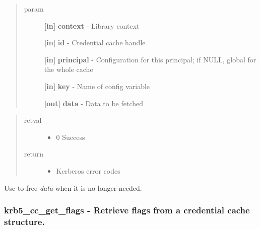 \documentclass[letterpaper,10pt,english]{sphinxmanual}
\begin{document}
\begin{quote}\begin{description}
\item[{param}] \leavevmode
\textbf{{[}in{]}} \textbf{context} - Library context

\textbf{{[}in{]}} \textbf{id} - Credential cache handle

\textbf{{[}in{]}} \textbf{principal} - Configuration for this principal; if NULL, global for the whole cache

\textbf{{[}in{]}} \textbf{key} - Name of config variable

\textbf{{[}out{]}} \textbf{data} - Data to be fetched

\end{description}\end{quote}
\begin{quote}\begin{description}
\item[{retval}] \leavevmode\begin{itemize}
\item {} 
0   Success

\end{itemize}

\item[{return}] \leavevmode\begin{itemize}
\item {} 
Kerberos error codes

\end{itemize}

\end{description}\end{quote}

Use {\hyperref[appdev/refs/api/krb5_free_data_contents:c.krb5_free_data_contents]{}} to free \emph{data} when it is no longer needed.


\subsubsection{krb5\_cc\_get\_flags -  Retrieve flags from a credential cache structure.}
\label{appdev/refs/api/krb5_cc_get_flags:krb5-cc-get-flags-retrieve-flags-from-a-credential-cache-structure}\label{appdev/refs/api/krb5_cc_get_flags::doc}

\begin{fulllineitems}
\label{appdev/refs/api/krb5_cc_get_flags:c.krb5_cc_get_flags}
\end{fulllineitems}
\end{document}
